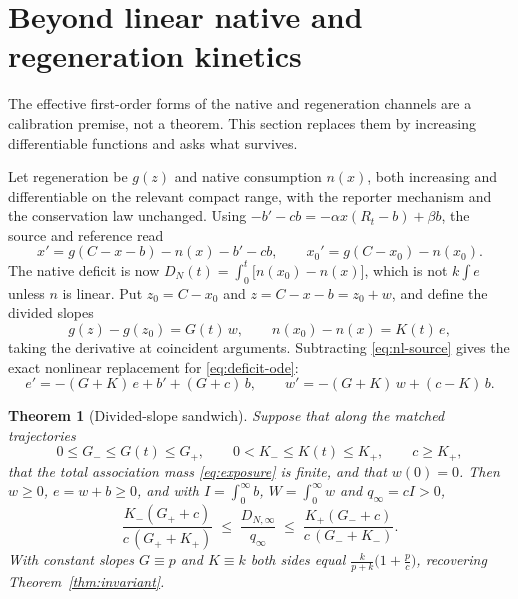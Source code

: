 \documentclass[11pt]{article}
\newtheorem{theorem}{Theorem}[section]
\theoremstyle{definition}
\theoremstyle{remark}
\begin{document}
\section{Beyond linear native and regeneration kinetics}
\label{sec:nonlinear}

The effective first-order forms of the native and regeneration channels are a
calibration premise, not a theorem. This section replaces them by increasing
differentiable functions and asks what survives.

Let regeneration be $g(z)$ and native consumption $n(x)$, both increasing and
differentiable on the relevant compact range, with the reporter mechanism and
the conservation law unchanged. Using
$-b'-cb=-\alpha x(R_t-b)+\beta b$, the source and reference read
\begin{equation}
x'=g(C-x-b)-n(x)-b'-cb,
\qquad
x_0'=g(C-x_0)-n(x_0).
\label{eq:nl-source}
\end{equation}
The native deficit is now $D_N(t)=\int_0^t\bigl[n(x_0)-n(x)\bigr]$, which is not
$k\int e$ unless $n$ is linear. Put $z_0=C-x_0$ and $z=C-x-b=z_0+w$, and define
the divided slopes
\begin{equation}
g(z)-g(z_0)=G(t)\,w,\qquad n(x_0)-n(x)=K(t)\,e,
\label{eq:slopes}
\end{equation}
taking the derivative at coincident arguments. Subtracting \eqref{eq:nl-source}
gives the exact nonlinear replacement for \eqref{eq:deficit-ode}:
\begin{equation}
e'=-(G+K)\,e+b'+(G+c)\,b,
\qquad
w'=-(G+K)\,w+(c-K)\,b .
\label{eq:nl-deficit}
\end{equation}

\begin{theorem}[Divided-slope sandwich]\label{thm:slope}
Suppose that along the matched trajectories
\[
0\le G_-\le G(t)\le G_+,\qquad 0<K_-\le K(t)\le K_+,\qquad c\ge K_+,
\]
that the total association mass \eqref{eq:exposure} is finite, and that
$w(0)=0$. Then $w\ge0$, $e=w+b\ge0$, and with
$I=\int_0^\infty b$, $W=\int_0^\infty w$ and $q_\infty=cI>0$,
\begin{equation}
\frac{K_-(G_++c)}{c\,(G_++K_+)}
\;\le\;\frac{D_{N,\infty}}{q_\infty}\;\le\;
\frac{K_+(G_-+c)}{c\,(G_-+K_-)} .
\label{eq:sandwich}
\end{equation}
With constant slopes $G\equiv p$ and $K\equiv k$ both sides equal
$\frac{k}{p+k}\bigl(1+\frac pc\bigr)$, recovering Theorem~\ref{thm:invariant}.
\end{theorem}
\end{document}

